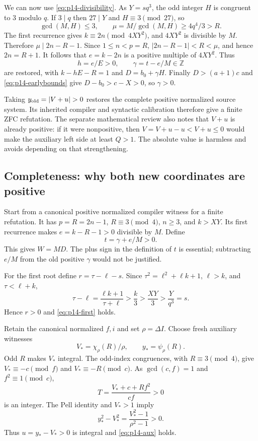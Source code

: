 We can now use \eqref{eq:p14-divisibility}. As $Y=sq^3$, the odd integer
$H$ is congruent to $3$ modulo $q$. If $3\mid q$ then $27\mid Y$ and
$H\equiv3\pmod{27}$, so
\[
 \gcd(M,H)\le3,\qquad
 \mu=M/\gcd(M,H)\ge4q^4/3>R.
\]
The first recurrence gives $k\equiv2n\pmod{4XY^2}$, and $4XY^2$ is
divisible by $M$. Therefore $\mu\mid2n-R-1$. Since $1\le n<p=R$,
$|2n-R-1|<R<\mu$, and hence $2n=R+1$. It follows that
$e=k-2n$ is a positive multiple of $4XY^2$. Thus
\[
 h=e/E>0,\qquad \gamma=t-e/M\in\mathbb Z
\]
are restored, with $k-hE-R=1$ and $D=b_0+\gamma H$.
Finally $D>(a+1)c$ and \eqref{eq:p14-earlybounds} give
$D-b_0>c-X>0$, so $\gamma>0$.

Taking $y_{\rm old}=|V+u|>0$ restores the complete positive normalized
source system. Its inherited compiler and syntactic calibration therefore
give a finite ZFC refutation. The separate mathematical review also notes
that $V+u$ is already positive: if it were nonpositive, then
$V=V+u-u<V+u\le0$ would make the auxiliary left side at least $Q>1$.
The absolute value is harmless and avoids depending on that strengthening.

\subsection{Completeness: why both new coordinates are positive}

Start from a canonical positive normalized compiler witness for a finite
refutation. It has $p=R=2n-1$, $R\equiv3\pmod4$, $n\ge3$, and $k>XY$.
Its first recurrence makes $e=k-R-1>0$ divisible by $M$. Define
\[
 t=\gamma+e/M>0.
\]
This gives $W=MD$. The plus sign in the definition of $t$ is essential;
subtracting $e/M$ from the old positive $\gamma$ would not be justified.

For the first root define $r=\tau-\ell-s$. Since
$\tau^2=\ell^2+\ell k+1$, $\ell>k$, and $\tau<\ell+k$,
\[
 \tau-\ell=\frac{\ell k+1}{\tau+\ell}>\frac{k}{3}
 >\frac{XY}{3}>\frac{Y}{q^3}=s.
\]
Hence $r>0$ and \eqref{eq:p14-first} holds.

Retain the canonical normalized $f,i$ and set $\rho=\Delta I$.
Choose fresh auxiliary witnesses
\[
 V_* =\chi_\rho(R)/\rho,\qquad y_* =\psi_\rho(R).
\]
Odd $R$ makes $V_*$ integral. The odd-index congruences, with
$R\equiv3\pmod4$, give $V_*\equiv-c\pmod f$ and
$V_*\equiv-R\pmod c$. As $\gcd(c,f)=1$ and $f^2\equiv1\pmod c$,
\[
 T=\frac{V_*+c+Rf^2}{cf}>0
\]
is an integer. The Pell identity and $V_*>1$ imply
\[
 y_*^2-V_*^2=\frac{V_*^2-1}{\rho^2-1}>0.
\]
Thus $u=y_*-V_*>0$ is integral and \eqref{eq:p14-aux} holds.

